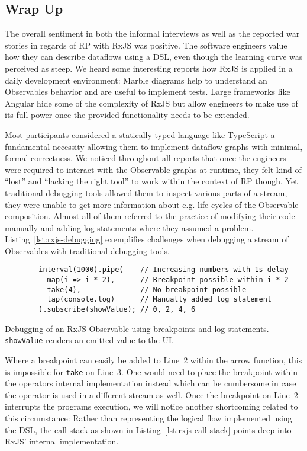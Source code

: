 \documentclass[12pt,a4paper]{article}
\begin{document}
\subsection{Wrap Up}

The overall sentiment in both the informal interviews as well as the reported war stories in regards of RP with RxJS was positive. The software engineers value how they can describe dataflows using a DSL, even though the learning curve was perceived as steep. We heard some interesting reports how RxJS is applied in a daily development environment: Marble diagrams help to understand  an Observables behavior and are useful to implement tests. Large frameworks like Angular hide some of the complexity of RxJS but allow engineers to make use of its full power once the provided functionality needs to be extended.

Most participants considered a statically typed language like TypeScript a fundamental necessity allowing them to implement dataflow graphs with minimal, formal correctness. We noticed throughout all reports that once the engineers were required to interact with the Observable graphs at runtime, they felt kind of ``lost'' and ``lacking the right tool'' to work within the context of RP though. Yet traditional debugging tools allowed them to inspect various parts of a stream, they were unable to get more information about e.g. life cycles of the Observable composition. Almost all of them referred to the practice of modifying their code manually and adding log statements where they assumed a problem. Listing~\ref{lst:rxjs-debugging} exemplifies challenges when debugging a stream of Observables with traditional debugging tools.

\begin{listing}[H]
	\begin{verbatim}
		interval(1000).pipe(    // Increasing numbers with 1s delay
		  map(i => i * 2),      // Breakpoint possible within i * 2
		  take(4),              // No breakpoint possible
		  tap(console.log)      // Manually added log statement
		).subscribe(showValue); // 0, 2, 4, 6
	\end{verbatim}
	\caption{Debugging of an RxJS Observable using breakpoints and log statements. \texttt{showValue} renders an emitted value to the UI.}
	\label{lst:rxjs-debugging}
\end{listing}

Where a breakpoint can easily be added to Line~2 within the arrow function, this is impossible for \texttt{take} on Line~3. One would need to place the breakpoint within the operators internal implementation instead which can be cumbersome in case the operator is used in a different stream as well. Once the breakpoint on Line~2 interrupts the programs execution, we will notice another shortcoming related to this circumstance: Rather than representing the logical flow implemented using the DSL, the call stack as shown in Listing~\ref{lst:rxjs-call-stack} points deep into RxJS' internal implementation.
\end{document}

